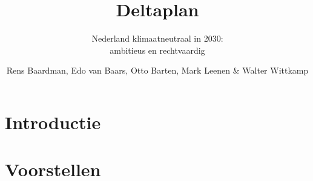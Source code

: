 \documentclass[DIV=calc]{scrbook}
\title{Deltaplan}
\subtitle{Nederland klimaatneutraal in 2030:\\ambitieus en rechtvaardig}
\author{Rens Baardman, Edo van Baars, Otto Barten, Mark Leenen \& Walter Wittkamp}
\begin{document}




\tableofcontents

\part{Introductie}
% 

% 
% 


\part{Voorstellen}


\end{document}
